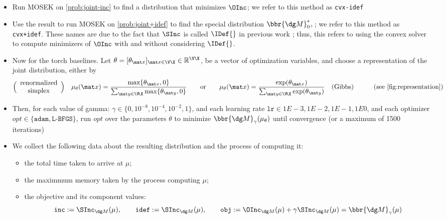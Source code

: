 \begin{itemize}    
    \item Run MOSEK on \eqref{prob:joint-inc} to find a distribution that minimizes $\OInc$; we refer to this method as \texttt{cvx-idef}
    \item Use the result to run MOSEK on \eqref{prob:joint+idef} to
      find the special distribution $\bbr{\dg M}^*_{0^+}$; we refer to
      this method as \texttt{cvx+idef}. These names are due to the
      fact that $\SInc$ is called $\IDef{}$ in previous work
      \parencite{pdg-aaai,one-true-loss}; 
    thus, this refers to using the convex solver to compute minimizers of $\OInc$ with and without considering $\IDef{}$.
    
    \item Now for the torch baselines. 
    Let $\theta = [\theta_{\mat x}]_{\mat x \in \V\X} \in \mathbb R^{\V\X}$, be a vector of optimization variables, and choose a representation of the joint distribution, either by
    \[
        \Big(\begin{array}{c}\text{renormalized}\\
        \text{simplex}\end{array}\Big)\quad
        \mu_{\theta}(\mat x) = \frac{\max\{\theta_{\mat x}, 0\} }
            {\sum_{\mat y \in \V\!\X}\max\{\theta_{\mat y}, 0\} }
    \qquad\text{or}\qquad
    \mu_{\theta}(\mat x) = \frac{\exp(\theta_{\mat x})}{\sum_{\mat y \in \V\!\X} \exp(\theta_{\mat y})}\quad(\text{Gibbs})
    \qquad\quad\text{(see \cref{fig:representation})}
    \]
    \item 
    Then, for each value of gamma: $\gamma \in \{0, 10^{-8}, 10^{-4}, 10^{-2}, 1\}$, and each learning rate $\texttt{lr} \in 1E-3, 1E-2, 1E-1, 1E0$, and each optimizer $\mathit{opt} \in \{\texttt{adam}, \texttt{L-BFGS}\}$, 
    run $\mathit{opt}$ over the parameters $\theta$ to minimize $\bbr{\dg M}_\gamma(\mu_{\theta})$
     until convergence (or a maximum of 1500 iterations)  
     
     \item We collect the following data about the resulting distribution and the process of computing it:
     \begin{itemize}[nosep]
         \item the total time taken to arrive at $\mu$;
         \item the maximmum memory taken by the process computing $\mu$;
         \item the objective and its component values:
         \vspace{-1ex}
         \[
            \texttt{inc} := \SInc_{\dg M}(\mu),
            \qquad \texttt{idef} := \SInc_{\dg M}(\mu),
            \qquad \texttt{obj} := \OInc_{\dg M}(\mu) + \gamma \SInc_{\dg M}(\mu) = \bbr{\dg M}_\gamma(\mu) 
        \]
     \end{itemize}
\end{itemize}



